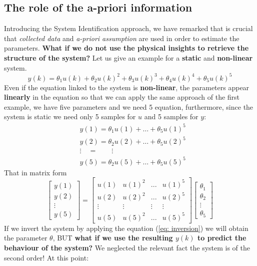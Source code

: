\subsection{The role of the a-priori information}
Introducing the System Identification approach, we have remarked that is crucial that \textit{collected data} and \textit{a-priori assumption} are used in order to estimate the parameters. \textbf{What if we do not use the physical insights to retrieve the structure of the system?} Let us give an example for a \textbf{static} and \textbf{non-linear} system.
\begin{equation*}
    y(k)=\theta_1u(k) + \theta_2 u(k)^2 + \theta_3 u(k)^3 + \theta_4 u(k)^4 + \theta_5 u(k)^5
\end{equation*}
Even if the equation linked to the system is \textbf{non-linear}, the parameters appear \textbf{linearly} in the equation so that we can apply the same approach of the first example, we have five parameters and we need 5 equation, furthermore, since the system is static we need only 5 samples for $u$ and 5 samples for $y$:
\begin{align*}
    &y(1)=\theta_1 u(1)+ \dots + \theta_5 u(1)^5\\
    &y(2)=\theta_2 u(2)+ \dots + \theta_5 u(2)^5\\
    &\vdots \quad = \quad \quad \vdots \\
    &y(5)=\theta_2 u(5) + \dots + \theta_5 u(5)^5
\end{align*}
\noindent
That in matrix form
\begin{equation*}
    \begin{bmatrix}
        y(1)\\y(2)\\\vdots\\y(5)
    \end{bmatrix}=\begin{bmatrix}
        u(1)&u(1)^2&...&u(1)^5\\
        u(2)&u(2)^2&...&u(2)^5\\
        \vdots&\vdots&\vdots&\vdots\\
        u(5)&u(5)^2&...&u(5)^5
    \end{bmatrix} \begin{bmatrix}
        \theta_1\\\theta_2\\\vdots\\\theta_5
    \end{bmatrix}
\end{equation*}
If we invert the system by applying the equation (\ref{eq: inversion}) we will obtain the parameter $\theta$, BUT \textbf{what if we use the resulting $y(k)$ to predict the behaviour of the system?} We neglected the relevant fact the system is of the second order! At this point:
